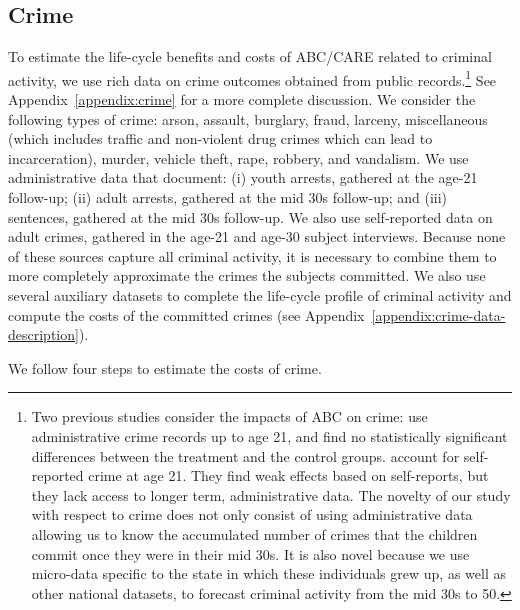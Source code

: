 \subsection{Crime}\label{sec:crime}

To estimate the life-cycle benefits and costs of ABC/CARE related to criminal activity, we use rich data on crime outcomes obtained from public records.\footnote{Two previous studies consider the impacts of ABC on crime: \citet{Clarke_Campbell_1998_ABC_Comparison_ECRQ} use administrative crime records up to age 21, and find no statistically significant differences between the treatment and the control groups. \cite{Barnett_Masse_2002_benefitcost,Barnett_Masse_2007_EER} account for self-reported crime at age 21. They find weak effects based on self-reports, but they lack access to longer term, administrative data. The novelty of our study with respect to crime does not only consist of using administrative data allowing us to know the accumulated number of crimes that the children commit once they were in their mid 30s. It is also novel because we use micro-data specific to the state in which these individuals grew up, as well as other national datasets, to forecast criminal activity from the mid 30s to 50.} See Appendix~\ref{appendix:crime} for a more complete discussion. We consider the following types of crime: arson, assault, burglary, fraud, larceny, miscellaneous (which includes traffic and non-violent drug crimes which can lead to incarceration), murder, vehicle theft, rape, robbery, and vandalism. We use administrative data that document: (i) youth arrests, gathered at the age-21 follow-up; (ii) adult arrests, gathered at the mid 30s follow-up; and (iii) sentences, gathered at the mid 30s follow-up. We also use self-reported data on adult crimes, gathered in the age-21 and age-30 subject interviews. Because none of these sources capture all criminal activity, it is necessary to combine them to more completely approximate the crimes the subjects committed. We also use several auxiliary datasets to complete the life-cycle profile of criminal activity and compute the costs of the committed crimes (see Appendix~\ref{appendix:crime-data-description}).

We follow four steps to estimate the costs of crime.

